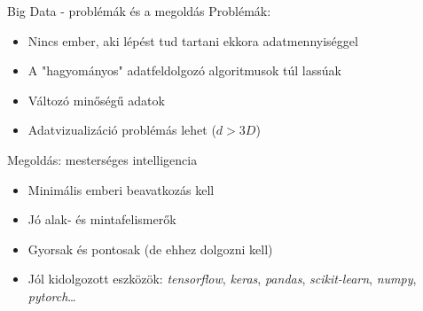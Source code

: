 \begin{frame}{Big Data - problémák és a megoldás}
    Problémák:
    \begin{itemize}
        \item Nincs ember, aki lépést tud tartani ekkora adatmennyiséggel
        \item A "hagyományos" adatfeldolgozó algoritmusok túl lassúak
        \item Változó minőségű adatok
        \item Adatvizualizáció problémás lehet ($d > 3D$)
    \end{itemize}
    
    Megoldás: mesterséges intelligencia
    \begin{itemize}
        \item Minimális emberi beavatkozás kell
        \item Jó alak- és mintafelismerők
        \item Gyorsak és pontosak (de ehhez dolgozni kell)
        \item Jól kidolgozott eszközök: {\it tensorflow}, {\it keras}, {\it pandas}, {\it scikit-learn}, {\it numpy}, {\it pytorch}\dots
    \end{itemize}
\end{frame}
